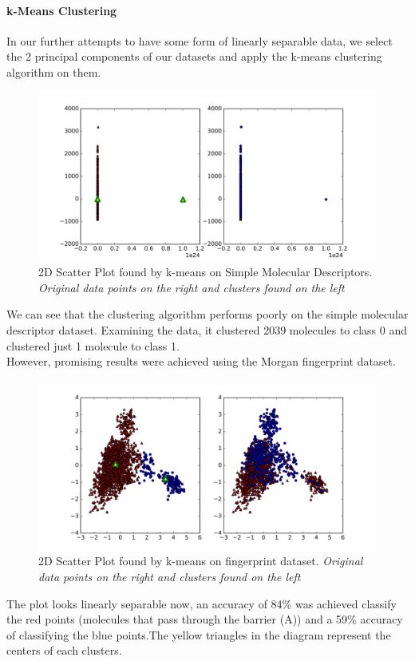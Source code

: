 \documentclass[a4paper,12pt]{report}
\begin{document}
				\paragraph{k-Means Clustering}
				In our further attempts to have some form of linearly separable data, we select the 2 principal components of our datasets and apply the k-means clustering algorithm on them.
					\begin{figure}[H]
						\centering
						\includegraphics[width=\textwidth,scale=1,totalheight=0.4\textheight]{images/kmeans_smd_scatter}
						\caption{2D Scatter Plot found by k-means on Simple Molecular Descriptors. \textit{Original data points on the right and clusters found on the left}}
						\label{fig:kmeans_smd_scatter}
					\end{figure}
				We can see that the clustering algorithm performs poorly on the simple molecular descriptor dataset. Examining the data, it clustered 2039 molecules to class 0 and clustered just 1 molecule to class 1. \\
				However, promising results were achieved using the Morgan fingerprint dataset.
					\begin{figure}[H]
						\centering
						\includegraphics[width=\textwidth,scale=1,totalheight=0.4\textheight]{images/kmeans_morgan_scatter}
						\caption{2D Scatter Plot found by k-means on fingerprint dataset. \textit{Original data points on the right and clusters found on the left}}
						\label{fig:kmeans_morgan_scatter}
					\end{figure}
				The plot looks linearly separable now, an accuracy of 84\% was achieved classify the red points (molecules that pass through the barrier (A)) and a 59\% accuracy of classifying the blue points.The yellow triangles in the diagram represent the centers of each clusters.
\end{document}
